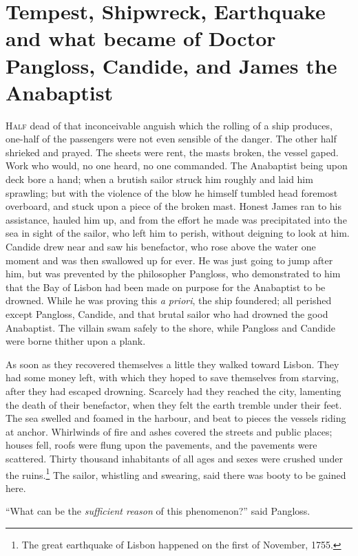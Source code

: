 \chapter{Tempest, Shipwreck, Earthquake and what became of Doctor Pangloss, Candide, and James the Anabaptist}
\thispagestyle{pter}
\vspace{-1cm}
\lettrine[lraise=0.1,nindent=0em,slope=-.5em]{H}{alf} dead of that inconceivable anguish which the rolling of a ship produces, one-half of the passengers were not even sensible of the danger. The other half shrieked and prayed. The sheets were rent, the masts broken, the vessel gaped. Work who would, no one heard, no one commanded. The Anabaptist being upon deck bore a hand; when a brutish sailor struck him roughly and laid him sprawling; but with the violence of the blow he himself tumbled head foremost overboard, and stuck upon a piece of the broken mast. Honest James ran to his assistance, hauled him up, and from the effort he made was precipitated into the sea in sight of the sailor, who left him to perish, without deigning to look at him. Candide drew near and saw his benefactor, who rose above the water one moment and was then swallowed up for ever. He was just going to jump after him, but was prevented by the philosopher Pangloss, who demonstrated to him that the Bay of Lisbon had been made on purpose for the Anabaptist to be drowned. While he was proving this \textit{a priori}, the ship foundered; all perished except Pangloss, Candide, and that brutal sailor who had drowned the good Anabaptist. The villain swam safely to the shore, while Pangloss and Candide were borne thither upon a plank.

As soon as they recovered themselves a little they walked toward Lisbon. They had some money left, with which they hoped to save themselves from starving, after they had escaped drowning. Scarcely had they reached the city, lamenting the death of their benefactor, when they felt the earth tremble under their feet. The sea swelled and foamed in the harbour, and beat to pieces the vessels riding at anchor. Whirlwinds of fire and ashes covered the streets and public places; houses fell, roofs were flung upon the pavements, and the pavements were scattered. Thirty thousand inhabitants of all ages and sexes were crushed under the ruins.\footnote{The great earthquake of Lisbon happened on the first of November, 1755.} The sailor, whistling and swearing, said there was booty to be gained here.

``What can be the \textit{sufficient reason} of this phenomenon?'' said Pangloss.

